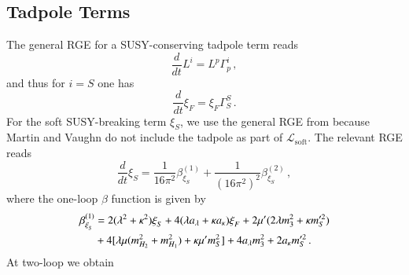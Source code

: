 \documentclass[final,3p,times]{elsarticle}
\newcommand{\lamsq}{\lambda^2}
\newcommand{\kapsq}{\kappa^2}
\newcommand{\dt}{\frac{d}{dt}}
\newcommand{\mhusq}{m^2_{H_2}}
\newcommand{\mhdsq}{m^2_{H_1}}
\newcommand{\mssq}{m_S^2}
\begin{document}
\subsection{Tadpole Terms}
The general RGE for a SUSY-conserving tadpole term reads
%
\begin{equation}
\dt L^i = L^p\Gamma_p^i\,,
\end{equation}
%
and thus for $i=S$ one has
%
\begin{equation}
\dt \xi_F = \xi_F \Gamma_S^S\,.
\end{equation}
%
For the soft SUSY-breaking term $\xi_S$, we use the general RGE from \cite{Yam94} because Martin and Vaughn \cite{MV94} do not include the tadpole as part of $\mathcal{L}_{\mathrm{soft}}$.  The relevant RGE reads
%
\begin{equation}
\dt \xi_S = \frac{1}{16\pi^2} \beta_{\xi_S}^{(1)} + \frac{1}{(16\pi^2)^2} \beta_{\xi_S}^{(2)}\,,
\end{equation}
%
where the one-loop $\beta$ function is given by
%
\begin{align}
\beta_{\xi^{}_S}^{(1)} &= 2(\lamsq + \kapsq)\xi^{}_S + 4(\lambda a_\lambda + \kappa a_\kappa)\xi^{}_F + 2\mu'(2\lambda m_3^2 + \kappa m_S'^2) \notag \\
%
&+ 4[\lambda\mu (\mhusq + \mhdsq) + \kappa\mu' \mssq] + 4a_\lambda m_3^2 + 2a_\kappa m_S'^2\,.
\end{align}
%
At two-loop we obtain
%
\end{document}
